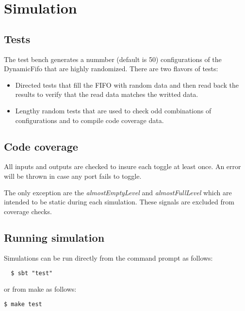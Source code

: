 \section{Simulation}

\subsection{Tests}
The test bench generates a nummber (default is 50) configurations of the
DynamicFifo that are highly randomized. There are two flavors of tests:

\begin{itemize}
  \item {Directed tests that fill the FIFO with random data and then read back
        the results to verify that the read data matches the writted data.}
  \item {Lengthy random tests that are used to check odd combinations of
        configurations and to compile code coverage data.}
\end{itemize}

\subsection{Code coverage}
All inputs and outputs are checked to insure each toggle at least once. An error
will be thrown in case any port fails to toggle.

The only exception are the \emph{almostEmptyLevel} and \emph{almostFullLevel}
which are intended to be static during each simulation. These signals are
excluded from coverage checks.

\subsection{Running simulation}

Simulations can be run directly from the command prompt as follows:

\begin{verbatim}
  $ sbt "test"
\end{verbatim}

or from make as follows:

\texttt{\$ make test}